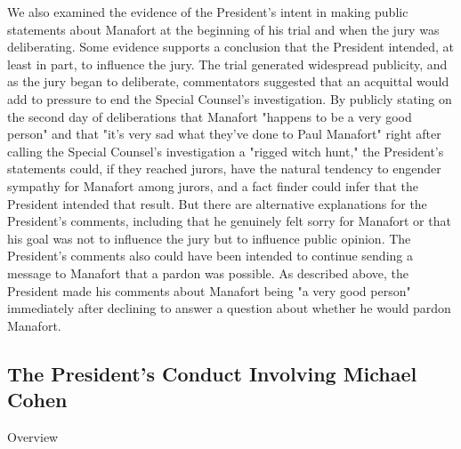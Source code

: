 We also examined the evidence of the President's intent in making public statements about Manafort at the beginning of his trial and when the jury was deliberating.
Some evidence supports a conclusion that the President intended, at least in part, to influence the jury.
The trial generated widespread publicity, and as the jury began to deliberate, commentators suggested that an acquittal would add to pressure to end the Special Counsel's investigation.
By publicly stating on the second day of deliberations that Manafort "happens to be a very good person" and that "it's very sad what they've done to Paul Manafort" right after calling the Special Counsel's investigation a "rigged witch hunt," the President's statements could, if they reached jurors, have the natural tendency to engender sympathy for Manafort among jurors, and a fact finder could infer that the President intended that result.
But there are alternative explanations for the President's comments, including that he genuinely felt sorry for Manafort or that his goal was not to influence the jury but to influence public opinion.
The President's comments also could have been intended to continue sending a message to Manafort that a pardon was possible.
As described above, the President made his comments about Manafort being "a very good person" immediately after declining to answer a question about whether he would pardon Manafort.


\subsection{The President's Conduct Involving Michael Cohen}

Overview

